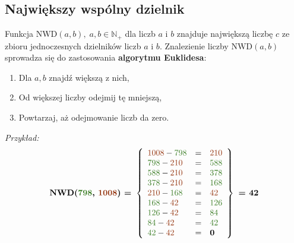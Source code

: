 \documentclass[14pt,a4paper]{extarticle}
\begin{document}
\noindent\subsection{Największy wspólny dzielnik}
Funkcja $\text{NWD}(a, b),\;a, b \in \mathbb{N}_{+}$ dla liczb $a$ i $b$ znajduje największą liczbę $c$ ze zbioru
jednoczesnych dzielników liczb $a$ i $b$. Znalezienie liczby $\text{NWD}(a, b)$ sprowadza się do zastosowania \textbf{algorytmu Euklidesa}:
\begin{enumerate}
   \item Dla $a, b$ znajdź większą z nich,
   \item Od większej liczby odejmij tę mniejszą,
   \item Powtarzaj, aż odejmowanie liczb da zero.
\end{enumerate}



\renewcommand{\arraycolsep}{0.5cm}
\renewcommand{\arraystretch}{1.4}



\noindent\textit{Przykład: }
\begin{equation*}
   \textbf{NWD(\textcolor{OliveGreen}{798}, \textcolor{RawSienna}{1008}) = }\left\{
\begin{array}{lcl}
   \textcolor{RawSienna}{1008} - \textcolor{OliveGreen}{798} & = & \textcolor{RawSienna}{210}\\
   \textcolor{OliveGreen}{798} - \textcolor{RawSienna}{210} & = & \textcolor{OliveGreen}{588}\\
   \textcolor{OliveGreen}{588} - \textcolor{RawSienna}{210} & = & \textcolor{OliveGreen}{378}\\
   \textcolor{OliveGreen}{378} - \textcolor{RawSienna}{210} & = & \textcolor{OliveGreen}{168}\\
   \textcolor{RawSienna}{210} - \textcolor{OliveGreen}{168} & = & \textcolor{RawSienna}{42}\\
   \textcolor{OliveGreen}{168} - \textcolor{RawSienna}{42} & = & \textcolor{OliveGreen}{126}\\
   \textcolor{OliveGreen}{126} - \textcolor{RawSienna}{42} & = & \textcolor{OliveGreen}{84}\\
   \textcolor{OliveGreen}{84} - \textcolor{RawSienna}{42} & = & \textcolor{OliveGreen}{42}\\
   \textcolor{OliveGreen}{42} - \textcolor{RawSienna}{42} & = & \textbf{0}
\end{array}
   \right\}\textbf{ = 42}
\end{equation*}
\newpage
\end{document}
